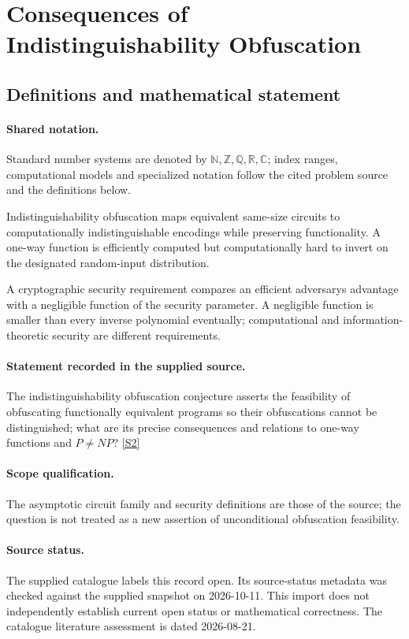 \documentclass[11pt]{article}
\newcommand{\sref}[2]{\hyperlink{source:#1:#2}{[S#2]}}
\begin{document}
\section{Consequences of Indistinguishability Obfuscation}\label{statement}

\subsection{Definitions and mathematical statement}

\paragraph{Shared notation.}Standard number systems are denoted by $\mathbb N,\mathbb Z,\mathbb Q,\mathbb R,\mathbb C$; index ranges, computational models and specialized notation follow the cited problem source and the definitions below.


Indistinguishability obfuscation maps equivalent same-size circuits to computationally indistinguishable encodings while preserving functionality. A one-way function is efficiently computed but computationally hard to invert on the designated random-input distribution.

A cryptographic security requirement compares an efficient adversary\textquotesingle s advantage with a negligible function of the security parameter. A negligible function is smaller than every inverse polynomial eventually; computational and information-theoretic security are different requirements.
\paragraph{Statement recorded in the supplied source.}
The indistinguishability obfuscation conjecture asserts the feasibility of obfuscating functionally equivalent programs so their obfuscations cannot be distinguished; what are its precise consequences and relations to one-way functions and $P\neq NP$? \sref{statement}{2}
\paragraph{Scope qualification.}
The asymptotic circuit family and security definitions are those of the source; the question is not treated as a new assertion of unconditional obfuscation feasibility.
\paragraph{Source status.}
The supplied catalogue labels this record open. Its source-status metadata was checked against the supplied snapshot on 2026-10-11. This import does not independently establish current open status or mathematical correctness. The catalogue literature assessment is dated 2026-08-21.
\end{document}
